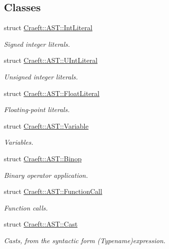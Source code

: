 \subsection*{Classes}
\begin{DoxyCompactItemize}
\item 
struct \hyperlink{struct_craeft_1_1_a_s_t_1_1_int_literal}{Craeft\+::\+A\+S\+T\+::\+Int\+Literal}
\begin{DoxyCompactList}\small\item\em Signed integer literals. \end{DoxyCompactList}\item 
struct \hyperlink{struct_craeft_1_1_a_s_t_1_1_u_int_literal}{Craeft\+::\+A\+S\+T\+::\+U\+Int\+Literal}
\begin{DoxyCompactList}\small\item\em Unsigned integer literals. \end{DoxyCompactList}\item 
struct \hyperlink{struct_craeft_1_1_a_s_t_1_1_float_literal}{Craeft\+::\+A\+S\+T\+::\+Float\+Literal}
\begin{DoxyCompactList}\small\item\em Floating-\/point literals. \end{DoxyCompactList}\item 
struct \hyperlink{struct_craeft_1_1_a_s_t_1_1_variable}{Craeft\+::\+A\+S\+T\+::\+Variable}
\begin{DoxyCompactList}\small\item\em Variables. \end{DoxyCompactList}\item 
struct \hyperlink{struct_craeft_1_1_a_s_t_1_1_binop}{Craeft\+::\+A\+S\+T\+::\+Binop}
\begin{DoxyCompactList}\small\item\em Binary operator application. \end{DoxyCompactList}\item 
struct \hyperlink{struct_craeft_1_1_a_s_t_1_1_function_call}{Craeft\+::\+A\+S\+T\+::\+Function\+Call}
\begin{DoxyCompactList}\small\item\em Function calls. \end{DoxyCompactList}\item 
struct \hyperlink{struct_craeft_1_1_a_s_t_1_1_cast}{Craeft\+::\+A\+S\+T\+::\+Cast}
\begin{DoxyCompactList}\small\item\em Casts, from the syntactic form (Typename)expression. \end{DoxyCompactList}\end{DoxyCompactItemize}
